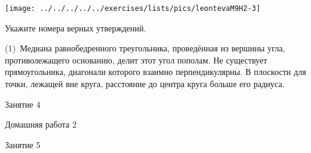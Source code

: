 \begin{class}[number=3]
\begin{listofex}
		\begin{minipage}[t]{\picwidth}
			\texttt{[image: ../../../../../exercises/lists/pics/leontevaM9H2-3]}
		\end{minipage}
		\item Укажите номера верных утверждений.
		\begin{tasks}(1)
			\task  Медиана равнобедренного треугольника, проведённая из вершины угла, противолежащего основанию, делит этот угол пополам.
			\task Не существует прямоугольника, диагонали которого взаимно перпендикулярны.
			\task В плоскости для точки, лежащей вне круга, расстояние до центра круга больше его радиуса.
		\end{tasks}
		
	\end{listofex}
\end{class}

\begin{class}[number=4]
	\begin{listofex}
		\item  Занятие 4
	\end{listofex}
\end{class}

\begin{homework}[number=2]
	\begin{listofex}
		\item Домашняя работа 2
	\end{listofex}
\end{homework}

\begin{class}[number=5]
	\begin{listofex}
		\item Занятие 5
	\end{listofex}
\end{class}

